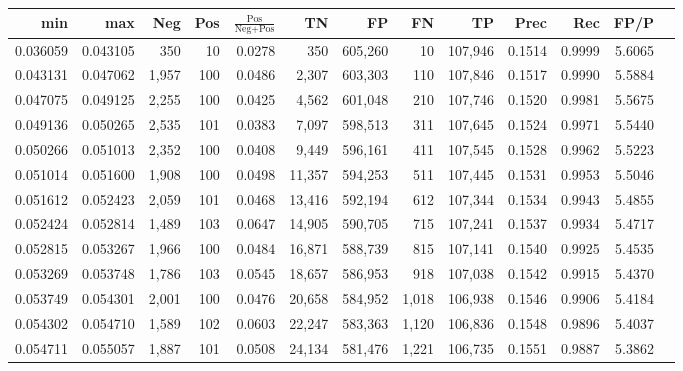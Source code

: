 \begin{tabular}{rrrrrrrrrrrrr}
\toprule
     min &      max &   Neg & Pos & $\frac{\text{Pos}}{\text{Neg}+\text{Pos}}$ &      TN &      FP &      FN &      TP &   Prec &    Rec &   FP/P \\
\midrule
0.036059 & 0.043105 &   350 &  10 &                                     0.0278 &     350 & 605,260 &      10 & 107,946 & 0.1514 & 0.9999 & 5.6065 \\
0.043131 & 0.047062 & 1,957 & 100 &                                     0.0486 &   2,307 & 603,303 &     110 & 107,846 & 0.1517 & 0.9990 & 5.5884 \\
0.047075 & 0.049125 & 2,255 & 100 &                                     0.0425 &   4,562 & 601,048 &     210 & 107,746 & 0.1520 & 0.9981 & 5.5675 \\
0.049136 & 0.050265 & 2,535 & 101 &                                     0.0383 &   7,097 & 598,513 &     311 & 107,645 & 0.1524 & 0.9971 & 5.5440 \\
0.050266 & 0.051013 & 2,352 & 100 &                                     0.0408 &   9,449 & 596,161 &     411 & 107,545 & 0.1528 & 0.9962 & 5.5223 \\
0.051014 & 0.051600 & 1,908 & 100 &                                     0.0498 &  11,357 & 594,253 &     511 & 107,445 & 0.1531 & 0.9953 & 5.5046 \\
0.051612 & 0.052423 & 2,059 & 101 &                                     0.0468 &  13,416 & 592,194 &     612 & 107,344 & 0.1534 & 0.9943 & 5.4855 \\
0.052424 & 0.052814 & 1,489 & 103 &                                     0.0647 &  14,905 & 590,705 &     715 & 107,241 & 0.1537 & 0.9934 & 5.4717 \\
0.052815 & 0.053267 & 1,966 & 100 &                                     0.0484 &  16,871 & 588,739 &     815 & 107,141 & 0.1540 & 0.9925 & 5.4535 \\
0.053269 & 0.053748 & 1,786 & 103 &                                     0.0545 &  18,657 & 586,953 &     918 & 107,038 & 0.1542 & 0.9915 & 5.4370 \\
0.053749 & 0.054301 & 2,001 & 100 &                                     0.0476 &  20,658 & 584,952 &   1,018 & 106,938 & 0.1546 & 0.9906 & 5.4184 \\
0.054302 & 0.054710 & 1,589 & 102 &                                     0.0603 &  22,247 & 583,363 &   1,120 & 106,836 & 0.1548 & 0.9896 & 5.4037 \\
0.054711 & 0.055057 & 1,887 & 101 &                                     0.0508 &  24,134 & 581,476 &   1,221 & 106,735 & 0.1551 & 0.9887 & 5.3862 \\

\end{tabular}
